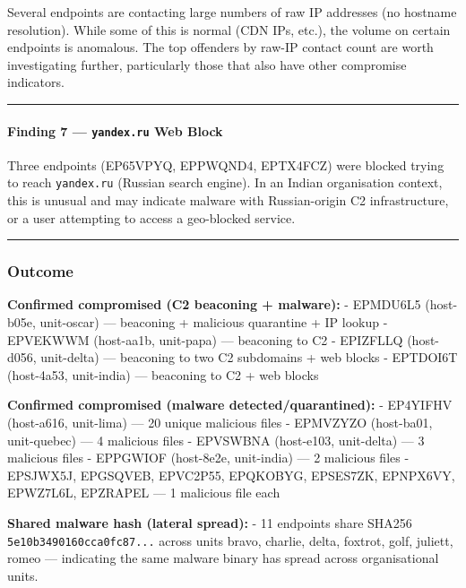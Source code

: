 \documentclass[
]{article}
\begin{document}
Several endpoints are contacting large numbers of raw IP addresses (no
hostname resolution). While some of this is normal (CDN IPs, etc.), the
volume on certain endpoints is anomalous. The top offenders by raw-IP
contact count are worth investigating further, particularly those that
also have other compromise indicators.

\begin{center}\rule{0.5\linewidth}{0.5pt}\end{center}

\paragraph{\texorpdfstring{Finding 7 --- \texttt{yandex.ru} Web
Block}{Finding 7 --- yandex.ru Web Block}}\label{finding-7-yandex.ru-web-block}

Three endpoints (EP65VPYQ, EPPWQND4, EPTX4FCZ) were blocked trying to
reach \texttt{yandex.ru} (Russian search engine). In an Indian
organisation context, this is unusual and may indicate malware with
Russian-origin C2 infrastructure, or a user attempting to access a
geo-blocked service.

\begin{center}\rule{0.5\linewidth}{0.5pt}\end{center}

\subsubsection{Outcome}\label{outcome}

\textbf{Confirmed compromised (C2 beaconing + malware):} - EPMDU6L5
(host-b05e, unit-oscar) --- beaconing + malicious quarantine + IP lookup
- EPVEKWWM (host-aa1b, unit-papa) --- beaconing to C2 - EPIZFLLQ
(host-d056, unit-delta) --- beaconing to two C2 subdomains + web blocks
- EPTDOI6T (host-4a53, unit-india) --- beaconing to C2 + web blocks

\textbf{Confirmed compromised (malware detected/quarantined):} -
EP4YIFHV (host-a616, unit-lima) --- 20 unique malicious files - EPMVZYZO
(host-ba01, unit-quebec) --- 4 malicious files - EPVSWBNA (host-e103,
unit-delta) --- 3 malicious files - EPPGWIOF (host-8e2e, unit-india) ---
2 malicious files - EPSJWX5J, EPGSQVEB, EPVC2P55, EPQKOBYG, EPSES7ZK,
EPNPX6VY, EPWZ7L6L, EPZRAPEL --- 1 malicious file each

\textbf{Shared malware hash (lateral spread):} - 11 endpoints share
SHA256 \texttt{5e10b3490160cca0fc87...} across units bravo, charlie,
delta, foxtrot, golf, juliett, romeo --- indicating the same malware
binary has spread across organisational units.
\end{document}
